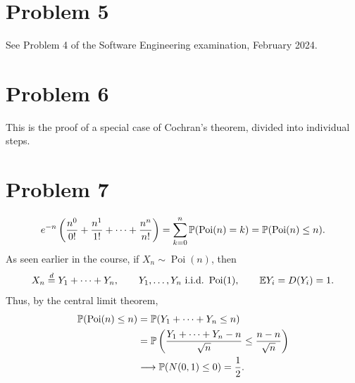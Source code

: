 \documentclass[11pt,a4paper]{article}
\begin{document}
\section*{Problem 5}
See Problem 4 of the Software Engineering examination, February 2024.

\section*{Problem 6}
This is the proof of a special case of Cochran's theorem, divided into individual steps.

\section*{Problem 7}
\[
e^{-n}\left(\frac{n^0}{0!}+\frac{n^1}{1!}+\cdots+\frac{n^n}{n!}\right)
=\sum_{k=0}^n\P(\operatorname{Poi}(n)=k)
=\P(\operatorname{Poi}(n)\le n).
\]
As seen earlier in the course, if $X_n\sim\operatorname{Poi}(n)$, then
\[
X_n\overset d=Y_1+\cdots+Y_n,
\qquad Y_1,\ldots,Y_n\ \text{i.i.d.}\ \operatorname{Poi}(1),
\qquad\E Y_i=D(Y_i)=1.
\]
Thus, by the central limit theorem,
\begin{align*}
\P(\operatorname{Poi}(n)\le n)
&=\P(Y_1+\cdots+Y_n\le n)\\
&=\P\left(\frac{Y_1+\cdots+Y_n-n}{\sqrt n}
\le\frac{n-n}{\sqrt n}\right)\\
&\longrightarrow\P(N(0,1)\le0)=\frac12.
\end{align*}
\end{document}
